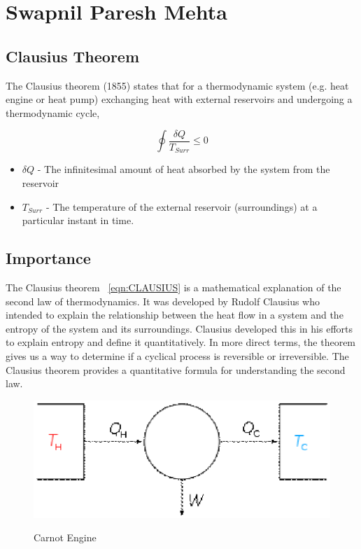 
\section{Swapnil Paresh Mehta}
\subsection{Clausius Theorem}
The Clausius theorem (1855) states that for a thermodynamic system (e.g. heat engine or heat pump) exchanging heat with external reservoirs and undergoing a thermodynamic cycle,
\linebreak
\begin{center}

\begin{equation}
\oint \dfrac{\delta Q}{T_{Surr}} \leqslant 0
\label{eqn:CLAUSIUS}
\end{equation}
\end{center}
\begin{itemize}
\item $\delta Q$ - The infinitesimal amount of heat absorbed by the system from the reservoir
\item $T_{Surr}$ - The temperature of the external reservoir (surroundings) at a particular instant in time.
\end{itemize}

\subsection{Importance}
The Clausius theorem ~\ref{eqn:CLAUSIUS} is a mathematical explanation of the second law of thermodynamics. It was developed by Rudolf Clausius who intended to explain the relationship between the heat flow in a system and the entropy of the system and its surroundings. Clausius developed this in his efforts to explain entropy and define it quantitatively. In more direct terms, the theorem gives us a way to determine if a cyclical process is reversible or irreversible. The Clausius theorem provides a quantitative formula for understanding the second law.

\begin{figure}[hbtp]
\caption{Carnot Engine}
\centering
\includegraphics[]{ME20B183.eps}
\label{fig:CARNOT}
\end{figure}
~\cite{webref}
